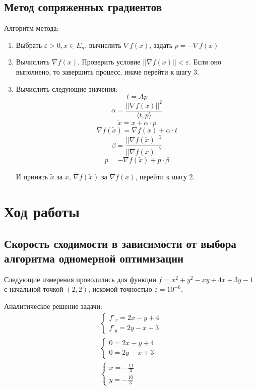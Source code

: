 	\subsection{Метод сопряженных градиентов}
	
	Алгоритм метода:
	\begin{enumerate}
		\item Выбрать \(\varepsilon > 0, x \in E_n\), вычислить \(\nabla f(x)\), задать \(p = -\nabla f(x)\)
		\item Вычислить \(\nabla f(x)\). Проверить условие \(||\nabla f(x)|| < \varepsilon\). Если оно выполнено, то завершить процесс, иначе перейти к шагу 3.
		\item Вычислить следующие значения:
		\[t = Ap\]
		\[\alpha = \frac{||\nabla f(x)||^2}{\langle t, p\rangle} \]
		\[\tilde{x} = x + \alpha \cdot p\]
		\[\nabla f(\tilde{x}) = \nabla f(x) + \alpha \cdot t\]
		\[\beta = \frac{||\nabla f(\tilde{x})||^2}{||\nabla f(x)||^2}\]
		\[p = - \nabla f(\tilde{x}) + p \cdot \beta\]
		
		И принять \(\tilde{x}\) за \(x\), \(\nabla f(\tilde{x})\) за \(\nabla f(x)\), перейти к шагу 2.
	\end{enumerate}
	
	\section{Ход работы}
	
	\subsection{Скорость сходимости в зависимости от выбора алгоритма одномерной оптимизации}
	
	Следующие измерения проводились для функции \(f = x^2 + y^2 - xy + 4x + 3y - 1\) с начальной точкой \((2, 2)\), искомой точностью \(\varepsilon = 10^{ - 6}\).
	
	Аналитическое решение задачи:
	\begin{align*}
	& \begin{cases}
	f'_x = 2x - y + 4 \\
	f'_y = 2y - x + 3
	\end{cases}  & \\
	& \begin{cases}
	0 = 2x - y + 4 \\
	0 = 2y - x + 3
	\end{cases}   \\
	& \begin{cases} x = - \frac{11}{3} \\ y = - \frac{10}{3} \end{cases}
	\end{align*}
	
